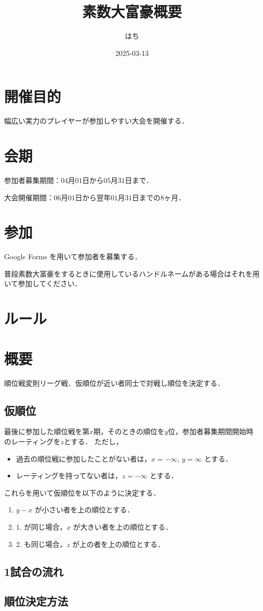 \documentclass[a4j,10pt]{jarticle}
\title{
    \LARGE\bf
    素数大富豪\tour \quad 概要
}
\author{はち}
\date{2025-03-13}
\newcommand{\tour}{順位戦}
\begin{document}
    \maketitle
    \thispagestyle{empty}

    \section{開催目的}
    幅広い実力のプレイヤーが参加しやすい大会を開催する．

    \section{会期}
    参加者募集期間：$04$月$01$日から$05$月$31$日まで．

    大会開催期間：$06$月$01$日から翌年$01$月$31$日までの$8$ヶ月．

    \section{参加}
    Google Forms を用いて参加者を募集する．

    普段素数大富豪をするときに使用しているハンドルネームがある場合はそれを用いて参加してください．

    \section{ルール}
    \section{概要}
    \tour 変則リーグ戦．仮順位が近い者同士で対戦し順位を決定する．

    \subsection{仮順位}
    最後に参加した\tour を第$x$期，そのときの順位を$y$位，参加者募集期間開始時のレーティングを$z$とする．
    ただし，
    \begin{itemize}
        \item 過去の\tour に参加したことがない者は，$x=-\infty$, $y=\infty$ とする．
        \item レーティングを持ってない者は，$z=-\infty$ とする．
    \end{itemize}

    これらを用いて仮順位を以下のように決定する．

    \begin{enumerate}
        \item $y-x$ が小さい者を上の順位とする．
        \item 1. が同じ場合，$x$ が大きい者を上の順位とする．
        \item 2. も同じ場合，$z$ が上の者を上の順位とする．
    \end{enumerate}

    \subsection{1試合の流れ}
    
    \subsection{順位決定方法}
\end{document}
